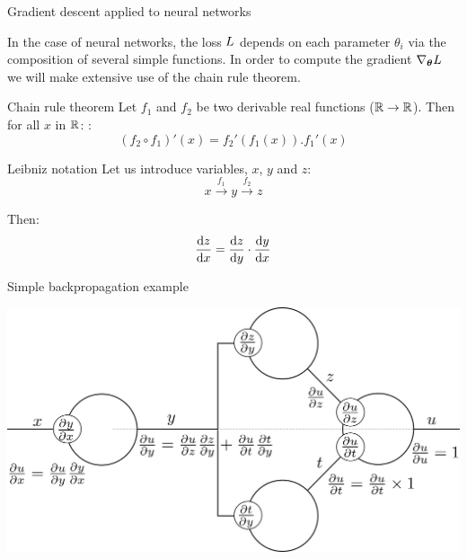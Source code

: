 \documentclass[xcolor=pdftex,dvipsnames,table,mathserif]{beamer}
\begin{document}
\begin{frame}{Gradient descent applied to neural networks}

  In the case of neural networks, the loss $L$ depends on each parameter $\theta_i$ via the composition of several simple functions. In order to compute the gradient $\nabla_{\boldsymbol{\theta}}L$ we will make extensive use of the chain rule theorem.

  \begin{block}{Chain rule theorem}
    Let $f_1$ and $f_2$ be two derivable real functions ($\mathbb{R} \rightarrow \mathbb{R}$). Then for all $x$ in $\mathbb{R}$:   :
    \[
     (f_2 \circ f_1)'(x) = f_2'(f_1(x)).f_1'(x)
    \]
  \end{block}


\begin{block}{Leibniz notation}
  Let us introduce variables, $x$, $y$ and $z$:
  \[x \xrightarrow{f_1} y \xrightarrow{f_2} z\]

  Then:
  \[\dv{z}{x} = \dv{z}{y} \cdot \dv{y}{x} \]

\end{block}

\end{frame}




\begin{frame}{Simple backpropagation example}

\includegraphics[width=\textwidth]{../graphics/bp.png}

\end{frame}
\end{document}
